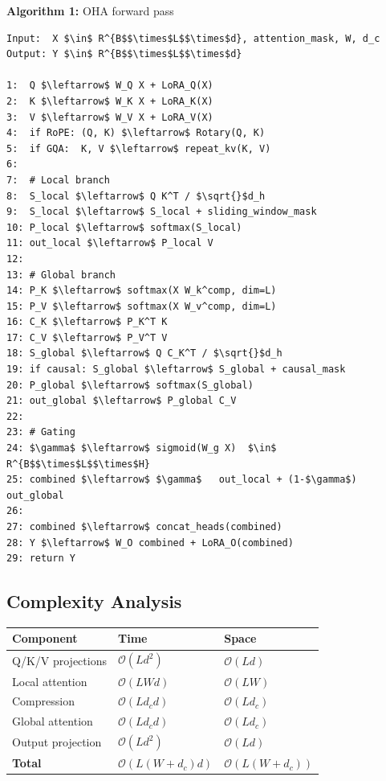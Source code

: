 \textbf{Algorithm 1:} OHA forward pass
\begin{lstlisting}
Input:  X $\in$ R^{B$$\times$L$$\times$d}, attention_mask, W, d_c
Output: Y $\in$ R^{B$$\times$L$$\times$d}

1:  Q $\leftarrow$ W_Q X + LoRA_Q(X)
2:  K $\leftarrow$ W_K X + LoRA_K(X)
3:  V $\leftarrow$ W_V X + LoRA_V(X)
4:  if RoPE: (Q, K) $\leftarrow$ Rotary(Q, K)
5:  if GQA:  K, V $\leftarrow$ repeat_kv(K, V)
6:
7:  # Local branch
8:  S_local $\leftarrow$ Q K^T / $\sqrt{}$d_h
9:  S_local $\leftarrow$ S_local + sliding_window_mask
10: P_local $\leftarrow$ softmax(S_local)
11: out_local $\leftarrow$ P_local V
12:
13: # Global branch
14: P_K $\leftarrow$ softmax(X W_k^comp, dim=L)
15: P_V $\leftarrow$ softmax(X W_v^comp, dim=L)
16: C_K $\leftarrow$ P_K^T K
17: C_V $\leftarrow$ P_V^T V
18: S_global $\leftarrow$ Q C_K^T / $\sqrt{}$d_h
19: if causal: S_global $\leftarrow$ S_global + causal_mask
20: P_global $\leftarrow$ softmax(S_global)
21: out_global $\leftarrow$ P_global C_V
22:
23: # Gating
24: $\gamma$ $\leftarrow$ sigmoid(W_g X)  $\in$ R^{B$$\times$L$$\times$H}
25: combined $\leftarrow$ $\gamma$   out_local + (1-$\gamma$)   out_global
26:
27: combined $\leftarrow$ concat_heads(combined)
28: Y $\leftarrow$ W_O combined + LoRA_O(combined)
29: return Y
\end{lstlisting}

\subsection{Complexity Analysis}

\begin{table}[H]
\centering
\small
\begin{tabular}{lll}
\toprule
\textbf{Component} & \textbf{Time} & \textbf{Space} \\
\midrule
Q/K/V projections & $\mathcal{O}(L d^2)$ & $\mathcal{O}(L d)$ \\
Local attention & $\mathcal{O}(L W d)$ & $\mathcal{O}(L W)$ \\
Compression & $\mathcal{O}(L d_c d)$ & $\mathcal{O}(L d_c)$ \\
Global attention & $\mathcal{O}(L d_c d)$ & $\mathcal{O}(L d_c)$ \\
Output projection & $\mathcal{O}(L d^2)$ & $\mathcal{O}(L d)$ \\
\textbf{Total} & $\mathcal{O}(L(W + d_c) d)$ & $\mathcal{O}(L(W + d_c))$ \\
\bottomrule
\end{tabular}
\end{table}

